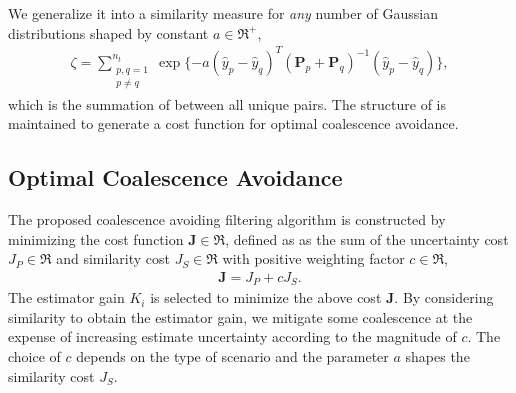 We generalize it into a similarity measure for \emph{any} number of Gaussian distributions shaped by constant $a\in\Re^+$,%
\begin{align}
\label{eqn:zetaGeneral}
\zeta=\sum\limits_{\substack{p,q=1\\p\neq q}}^{n_t} \exp \{-a(\hat y_{p}- \hat y_{q})^T({\mathbf P}_{p}
+{\mathbf P}_{q})^{-1}(\hat y_{p}-\hat y_{q})\},
\end{align}
which is the summation of  between all unique pairs.
The structure of  is maintained to generate a cost function for optimal coalescence avoidance.

	
\subsection{Optimal Coalescence Avoidance}


The proposed coalescence avoiding filtering algorithm is constructed by minimizing the cost function $\mathbf{J}\in\Re$, defined as as the sum of the uncertainty cost $J_P\in\Re$ and similarity cost $J_S\in\Re$ with positive weighting factor $c\in\Re$,
\begin{align}
\label{eqn:CostGen}
\mathbf{J}=J_P+cJ_S.
\end{align}
The estimator gain $K_i$ is selected to minimize the above cost $\mathbf{J}$. By considering similarity to obtain the estimator gain, we mitigate some coalescence at the expense of increasing estimate uncertainty according to the magnitude of $c$.
The choice of $c$ depends on the type of scenario and the parameter $a$ shapes the similarity cost $J_S$.


